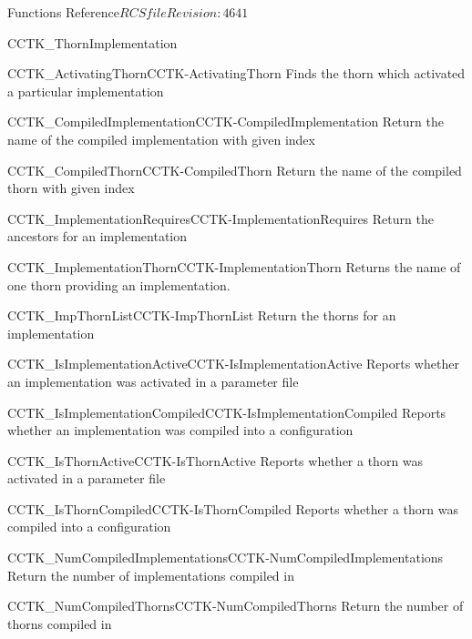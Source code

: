\begin{cactuspart}{ Functions Reference}{$RCSfile$}{$Revision: 4641 $}
\begin{FunctionDescription}{CCTK\_ThornImplementation}
\begin{SeeAlsoSection}
\begin{SeeAlso2}{CCTK\_ActivatingThorn}{CCTK-ActivatingThorn}
  Finds the thorn which activated a particular implementation
\end{SeeAlso2}
\begin{SeeAlso2}{CCTK\_CompiledImplementation}{CCTK-CompiledImplementation}
  Return the name of the compiled implementation with given index
\end{SeeAlso2}
\begin{SeeAlso2}{CCTK\_CompiledThorn}{CCTK-CompiledThorn}
  Return the name of the compiled thorn with given index
\end{SeeAlso2}
\begin{SeeAlso2}{CCTK\_ImplementationRequires}{CCTK-ImplementationRequires}
  Return the ancestors for an implementation
\end{SeeAlso2}
\begin{SeeAlso2}{CCTK\_ImplementationThorn}{CCTK-ImplementationThorn}
  Returns the name of one thorn providing an implementation.
\end{SeeAlso2}
\begin{SeeAlso2}{CCTK\_ImpThornList}{CCTK-ImpThornList}
  Return the thorns for an implementation
\end{SeeAlso2}
\begin{SeeAlso2}{CCTK\_IsImplementationActive}{CCTK-IsImplementationActive}
  Reports whether an implementation was activated in a parameter file
\end{SeeAlso2}
\begin{SeeAlso2}{CCTK\_IsImplementationCompiled}{CCTK-IsImplementationCompiled}
  Reports whether an implementation was compiled into a configuration
\end{SeeAlso2}
\begin{SeeAlso2}{CCTK\_IsThornActive}{CCTK-IsThornActive}
  Reports whether a thorn was activated in a parameter file
\end{SeeAlso2}
\begin{SeeAlso2}{CCTK\_IsThornCompiled}{CCTK-IsThornCompiled}
  Reports whether a thorn was compiled into a configuration
\end{SeeAlso2}
\begin{SeeAlso2}{CCTK\_NumCompiledImplementations}{CCTK-NumCompiledImplementations}
  Return the number of implementations compiled in
\end{SeeAlso2}
\begin{SeeAlso2}{CCTK\_NumCompiledThorns}{CCTK-NumCompiledThorns}
  Return the number of thorns compiled in
\end{SeeAlso2}
\end{SeeAlsoSection}


\end{FunctionDescription}
\end{cactuspart}
